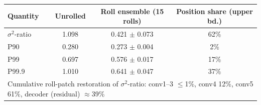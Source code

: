 \begin{tabular}{lccc}
\toprule
Quantity & Unrolled & Roll ensemble (15 rolls) & Position share (upper bd.) \\
\midrule
$\sigma^2$-ratio & 1.098 & 0.421 $\pm$ 0.073 & 62\% \\
P90 & 0.280 & 0.273 $\pm$ 0.004 & 2\% \\
P99 & 0.697 & 0.576 $\pm$ 0.017 & 17\% \\
P99.9 & 1.010 & 0.641 $\pm$ 0.047 & 37\% \\
\midrule
\multicolumn{4}{l}{\footnotesize Cumulative roll-patch restoration of $\sigma^2$-ratio: conv1--3 $\leq$1\%, conv4 12\%, conv5 61\%, decoder (residual) $\approx$39\%}\\
\bottomrule
\end{tabular}
